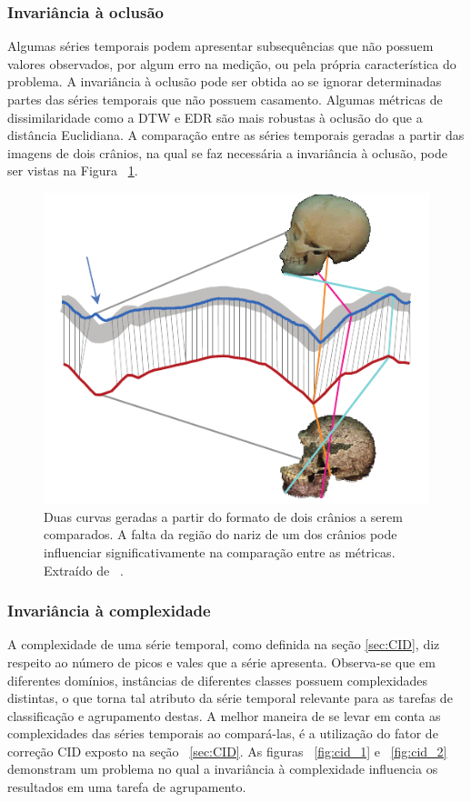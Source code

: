 \subsubsection{Invariância à oclusão}

Algumas séries temporais podem apresentar subsequências que não possuem valores observados, por algum erro na medição, ou pela própria característica do problema. A invariância à oclusão pode ser obtida ao se ignorar determinadas partes das séries temporais que não possuem casamento. Algumas métricas de dissimilaridade como a DTW e EDR são mais robustas à oclusão do que a distância Euclidiana. A comparação entre as séries temporais geradas a partir das imagens de dois crânios, na qual se faz necessária a invariância à oclusão, pode ser vistas na Figura ~\ref{fig:inv_oclusao}.

\begin{figure}[h!]
	\includegraphics[width=\linewidth]{figuras/invariancias/oclusao.png}
	\caption{Duas curvas geradas a partir do formato de dois crânios a serem comparados. A falta da região do nariz de um dos crânios pode influenciar significativamente na comparação entre as métricas. Extraído de ~\parencite{CID}.}
	\label{fig:inv_oclusao}
\end{figure}

\subsubsection{Invariância à complexidade}

A complexidade de uma série temporal, como definida na seção \ref{sec:CID}, diz respeito ao número de picos e vales que a série apresenta. Observa-se que em diferentes domínios, instâncias de diferentes classes possuem complexidades distintas, o que torna tal atributo da série temporal relevante para as tarefas de classificação e agrupamento destas. A melhor maneira de se levar em conta as complexidades das séries temporais ao compará-las, é a utilização do fator de correção CID exposto na seção ~\ref{sec:CID}. As figuras ~\ref{fig:cid_1} e ~\ref{fig:cid_2} demonstram um problema no qual a invariância à complexidade influencia os resultados em uma tarefa de agrupamento.

